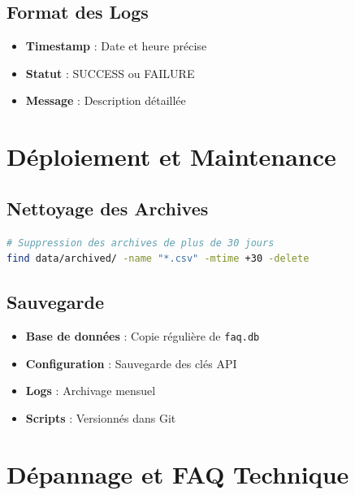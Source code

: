 \documentclass[11pt,a4paper]{article}
\begin{document}
\subsection{Format des Logs}
\begin{itemize}
    \item \textbf{Timestamp} : Date et heure précise
    \item \textbf{Statut} : SUCCESS ou FAILURE
    \item \textbf{Message} : Description détaillée
\end{itemize}

\section{Déploiement et Maintenance}
\label{sec:deployment}

\subsection{Nettoyage des Archives}
\begin{lstlisting}[language=bash]
# Suppression des archives de plus de 30 jours
find data/archived/ -name "*.csv" -mtime +30 -delete
\end{lstlisting}

\subsection{Sauvegarde}
\begin{itemize}
    \item \textbf{Base de données} : Copie régulière de \texttt{faq.db}
    \item \textbf{Configuration} : Sauvegarde des clés API
    \item \textbf{Logs} : Archivage mensuel
    \item \textbf{Scripts} : Versionnés dans Git
\end{itemize}

\section{Dépannage et FAQ Technique}
\label{sec:troubleshooting}
\end{document}
